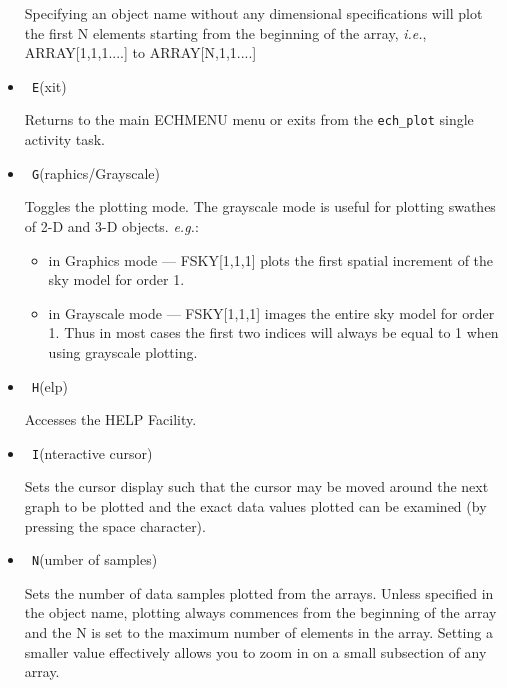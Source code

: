\documentclass[twoside,11pt]{article}
\renewcommand{\_}{\texttt{\symbol{95}}}
\newcommand{\sunspec}[2]{#1}
\newcommand{\myindex}[1]{\index{#1}}
\newcommand{\sunspec}[2]{#2}
\newcommand{\myindex}[1]{}
\begin{document}
\begin{itemize}
     Specifying an object name without any dimensional specifications will
     plot the first N elements starting from the beginning of the array,
     {\it{i.e.}}, ARRAY[1,1,1....] to ARRAY[N,1,1....]

\item {\sunspec{\Large\tt}{\bf} E}(xit)

     Returns to the main ECHMENU menu or exits from
     the \verb+ech_plot+ single activity task.

\item {\sunspec{\Large\tt}{\bf} G}(raphics/Grayscale)

     Toggles the plotting mode. The
     grayscale mode is useful for plotting swathes of 2-D and 3-D objects.
     {\it{e.g.}}:

     \begin{itemize}

     \item in Graphics mode --- FSKY[1,1,1] plots the first spatial
            increment of the sky model for order 1.

     \item in Grayscale mode --- FSKY[1,1,1] images the entire sky model
            for order 1.  Thus in most cases the first two indices will
            always be equal to 1 when using grayscale plotting.

     \end{itemize}

\item {\sunspec{\Large\tt}{\bf} H}(elp)

     Accesses the HELP Facility.

\item {\sunspec{\Large\tt}{\bf} I}(nteractive cursor)

     Sets the cursor display such that
     the cursor may be moved around the next graph to be plotted and the
     exact data values plotted can be examined (by pressing the space
     character).

\item {\sunspec{\Large\tt}{\bf} N}(umber of samples)
     \myindex{Plotter!subsets}

     Sets the number of data samples plotted from the arrays.
     Unless specified in the object name,
     plotting always commences from the beginning of the array and the N
     is set to the maximum number of elements in the array. Setting a
     smaller value effectively allows you to zoom in on a small subsection
     of any array.


\end{itemize}
\end{document}
